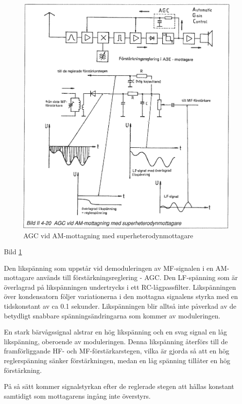 \begin{figure}
  \includegraphics[width=\textwidth]{images/bild_2_4-20}
  \caption{AGC vid AM-mottagning med superheterodynmottagare}
  \label{fig:bildII4-20}
\end{figure}

Bild \ref{fig:bildII4-20}

Den likspänning som uppstår vid demoduleringen av MF-signalen i en
AM-mottagare används till förstärkningsreglering - AGC.  Den
LF-spänning som är överlagrad på likspänningen undertrycks i ett
RC-lågpassfilter. Likspänningen över kondensatorn följer variationerna
i den mottagna signalens styrka med en tidskonstant av ca 0.1
sekunder. Likspänningen blir alltså inte påverkad av de betydligt
snabbare spänningsändringarna som kommer av moduleringen.

En stark bärvågssignal alstrar en hög likspänning och en svag signal
en låg likspänning, oberoende av moduleringen.  Denna likspänning
återförs till de framförliggande HF- och MF-förstärkarstegen, vilka är
gjorda så att en hög reglerspänning sänker förstärkningen, medan en
låg spänning tillåter en hög förstärkning.

På så sätt kommer signalstyrkan efter de reglerade stegen att hållas
konstant samtidigt som mottagarens ingång inte överstyrs.

